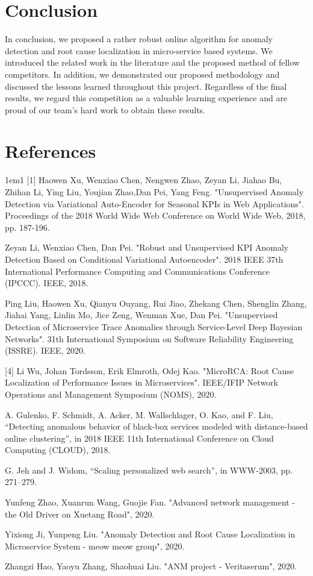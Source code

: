 \documentclass[12pt]{article}
\begin{document}
\section{Conclusion}
In conclusion, we proposed a rather robust online algorithm for anomaly detection and root cause localization in micro-service based systems. We introduced the related work in the literature and the proposed method of fellow competitors. In addition, we demonstrated our proposed methodology and discussed the lessons learned throughout this project. Regardless of the final results, we regard this competition as a valuable learning experience and are proud of our team's hard work to obtain these results. 
\section*{References}
\begin{hangparas}{1em}{1}
[1] Haowen Xu,  Wenxiao  Chen, Nengwen Zhao,  Zeyan  Li, Jiahao  Bu, Zhihan  Li,  Ying Liu,  Youjian Zhao,Dan  Pei, Yang Feng. "Unsupervised Anomaly Detection via Variational Auto-Encoder for Seasonal KPIs in Web Applications". Proceedings of the 2018 World Wide Web Conference on World Wide Web, 2018, pp. 187-196.

\smallskip\smallskip
[2] Zeyan Li, Wenxiao Chen, Dan Pei. "Robust and Unsupervised KPI Anomaly Detection Based on Conditional Variational Autoencoder". 2018 IEEE 37th International Performance Computing and Communications Conference (IPCCC). IEEE, 2018.

\smallskip\smallskip
[3] Ping Liu, Haowen Xu, Qianyu Ouyang, Rui Jiao, Zhekang Chen, Shenglin Zhang, Jiahai Yang, Linlin Mo, Jice Zeng, Wenman Xue, Dan Pei. "Unsupervised Detection of Microservice Trace Anomalies through Service-Level Deep Bayesian Networks". 31th International Symposium on Software Reliability Engineering (ISSRE). IEEE, 2020.


[4] Li Wu, Johan Tordsson, Erik Elmroth, Odej Kao. "MicroRCA: Root Cause Localization of Performance Issues in Microservices". IEEE/IFIP Network Operations and Management Symposium (NOMS), 2020. 

\smallskip\smallskip
[5] A. Gulenko, F. Schmidt, A. Acker, M. Wallschlager, O. Kao, and F. Liu, “Detecting anomalous behavior of black-box services modeled with distance-based online clustering”, in 2018 IEEE 11th International Conference on Cloud Computing (CLOUD), 2018.

\smallskip\smallskip
[6] G. Jeh and J. Widom, “Scaling personalized web search”, in WWW-2003, pp. 271–279.

\smallskip\smallskip
[7] Yunfeng Zhao, Xuanrun Wang, Guojie Fan. "Advanced network management - the Old Driver on Xuetang Road", 2020. 

\smallskip\smallskip
[8] Yixiong Ji, Yunpeng Liu. "Anomaly Detection and Root Cause Localization in Microservice System - meow meow group", 2020.

\smallskip\smallskip
[9] Zhangzi Hao, Yaoyu Zhang, Shaohuai Liu. "ANM project - Veritaserum", 2020. 

\vfill %
\break

\end{hangparas}
\end{document}
